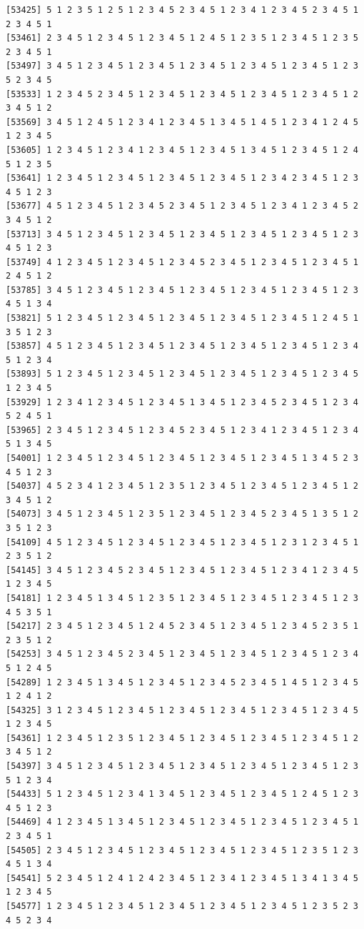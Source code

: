\documentclass[
  english,
]{book}
\begin{document}
\begin{verbatim}
[53425] 5 1 2 3 5 1 2 5 1 2 3 4 5 2 3 4 5 1 2 3 4 1 2 3 4 5 2 3 4 5 1 2 3 4 5 1
[53461] 2 3 4 5 1 2 3 4 5 1 2 3 4 5 1 2 4 5 1 2 3 5 1 2 3 4 5 1 2 3 5 2 3 4 5 1
[53497] 3 4 5 1 2 3 4 5 1 2 3 4 5 1 2 3 4 5 1 2 3 4 5 1 2 3 4 5 1 2 3 5 2 3 4 5
[53533] 1 2 3 4 5 2 3 4 5 1 2 3 4 5 1 2 3 4 5 1 2 3 4 5 1 2 3 4 5 1 2 3 4 5 1 2
[53569] 3 4 5 1 2 4 5 1 2 3 4 1 2 3 4 5 1 3 4 5 1 4 5 1 2 3 4 1 2 4 5 1 2 3 4 5
[53605] 1 2 3 4 5 1 2 3 4 1 2 3 4 5 1 2 3 4 5 1 3 4 5 1 2 3 4 5 1 2 4 5 1 2 3 5
[53641] 1 2 3 4 5 1 2 3 4 5 1 2 3 4 5 1 2 3 4 5 1 2 3 4 2 3 4 5 1 2 3 4 5 1 2 3
[53677] 4 5 1 2 3 4 5 1 2 3 4 5 2 3 4 5 1 2 3 4 5 1 2 3 4 1 2 3 4 5 2 3 4 5 1 2
[53713] 3 4 5 1 2 3 4 5 1 2 3 4 5 1 2 3 4 5 1 2 3 4 5 1 2 3 4 5 1 2 3 4 5 1 2 3
[53749] 4 1 2 3 4 5 1 2 3 4 5 1 2 3 4 5 2 3 4 5 1 2 3 4 5 1 2 3 4 5 1 2 4 5 1 2
[53785] 3 4 5 1 2 3 4 5 1 2 3 4 5 1 2 3 4 5 1 2 3 4 5 1 2 3 4 5 1 2 3 4 5 1 3 4
[53821] 5 1 2 3 4 5 1 2 3 4 5 1 2 3 4 5 1 2 3 4 5 1 2 3 4 5 1 2 4 5 1 3 5 1 2 3
[53857] 4 5 1 2 3 4 5 1 2 3 4 5 1 2 3 4 5 1 2 3 4 5 1 2 3 4 5 1 2 3 4 5 1 2 3 4
[53893] 5 1 2 3 4 5 1 2 3 4 5 1 2 3 4 5 1 2 3 4 5 1 2 3 4 5 1 2 3 4 5 1 2 3 4 5
[53929] 1 2 3 4 1 2 3 4 5 1 2 3 4 5 1 3 4 5 1 2 3 4 5 2 3 4 5 1 2 3 4 5 2 4 5 1
[53965] 2 3 4 5 1 2 3 4 5 1 2 3 4 5 2 3 4 5 1 2 3 4 1 2 3 4 5 1 2 3 4 5 1 3 4 5
[54001] 1 2 3 4 5 1 2 3 4 5 1 2 3 4 5 1 2 3 4 5 1 2 3 4 5 1 3 4 5 2 3 4 5 1 2 3
[54037] 4 5 2 3 4 1 2 3 4 5 1 2 3 5 1 2 3 4 5 1 2 3 4 5 1 2 3 4 5 1 2 3 4 5 1 2
[54073] 3 4 5 1 2 3 4 5 1 2 3 5 1 2 3 4 5 1 2 3 4 5 2 3 4 5 1 3 5 1 2 3 5 1 2 3
[54109] 4 5 1 2 3 4 5 1 2 3 4 5 1 2 3 4 5 1 2 3 4 5 1 2 3 1 2 3 4 5 1 2 3 5 1 2
[54145] 3 4 5 1 2 3 4 5 2 3 4 5 1 2 3 4 5 1 2 3 4 5 1 2 3 4 1 2 3 4 5 1 2 3 4 5
[54181] 1 2 3 4 5 1 3 4 5 1 2 3 5 1 2 3 4 5 1 2 3 4 5 1 2 3 4 5 1 2 3 4 5 3 5 1
[54217] 2 3 4 5 1 2 3 4 5 1 2 4 5 2 3 4 5 1 2 3 4 5 1 2 3 4 5 2 3 5 1 2 3 5 1 2
[54253] 3 4 5 1 2 3 4 5 2 3 4 5 1 2 3 4 5 1 2 3 4 5 1 2 3 4 5 1 2 3 4 5 1 2 4 5
[54289] 1 2 3 4 5 1 3 4 5 1 2 3 4 5 1 2 3 4 5 2 3 4 5 1 4 5 1 2 3 4 5 1 2 4 1 2
[54325] 3 1 2 3 4 5 1 2 3 4 5 1 2 3 4 5 1 2 3 4 5 1 2 3 4 5 1 2 3 4 5 1 2 3 4 5
[54361] 1 2 3 4 5 1 2 3 5 1 2 3 4 5 1 2 3 4 5 1 2 3 4 5 1 2 3 4 5 1 2 3 4 5 1 2
[54397] 3 4 5 1 2 3 4 5 1 2 3 4 5 1 2 3 4 5 1 2 3 4 5 1 2 3 4 5 1 2 3 5 1 2 3 4
[54433] 5 1 2 3 4 5 1 2 3 4 1 3 4 5 1 2 3 4 5 1 2 3 4 5 1 2 4 5 1 2 3 4 5 1 2 3
[54469] 4 1 2 3 4 5 1 3 4 5 1 2 3 4 5 1 2 3 4 5 1 2 3 4 5 1 2 3 4 5 1 2 3 4 5 1
[54505] 2 3 4 5 1 2 3 4 5 1 2 3 4 5 1 2 3 4 5 1 2 3 4 5 1 2 3 5 1 2 3 4 5 1 3 4
[54541] 5 2 3 4 5 1 2 4 1 2 4 2 3 4 5 1 2 3 4 1 2 3 4 5 1 3 4 1 3 4 5 1 2 3 4 5
[54577] 1 2 3 4 5 1 2 3 4 5 1 2 3 4 5 1 2 3 4 5 1 2 3 4 5 1 2 3 5 2 3 4 5 2 3 4

\end{verbatim}
\end{document}

